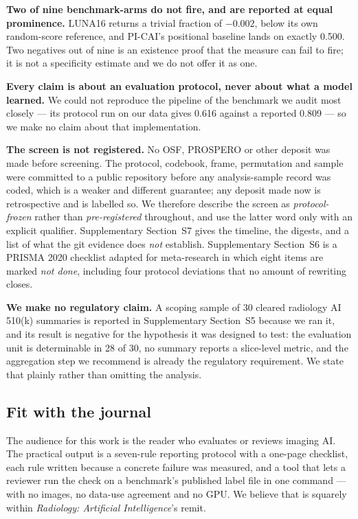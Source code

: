 \documentclass[11pt,a4paper]{article}
\begin{document}
\textbf{Two of nine benchmark-arms do not fire, and are reported at equal
prominence.} LUNA16 returns a trivial fraction of $-0.002$, below its own random-score
reference, and PI-CAI's positional baseline lands on exactly 0.500. Two negatives out
of nine is an existence proof that the measure can fail to fire; it is not a
specificity estimate and we do not offer it as one.

\textbf{Every claim is about an evaluation protocol, never about what a model
learned.} We could not reproduce the pipeline of the benchmark we audit most closely
--- its protocol run on our data gives 0.616 against a reported 0.809 --- so we make
no claim about that implementation.

\textbf{The screen is not registered.} No OSF, PROSPERO or other deposit was made
before screening. The protocol, codebook, frame, permutation and sample were committed
to a public repository before any analysis-sample record was coded, which is a weaker
and different guarantee; any deposit made now is retrospective and is labelled so. We
therefore describe the screen as \emph{protocol-frozen} rather than
\emph{pre-registered} throughout, and use the latter word only with an explicit
qualifier. Supplementary Section~S7 gives the timeline, the digests, and a list of what
the git evidence does \emph{not} establish. Supplementary Section~S6 is a PRISMA 2020
checklist adapted for meta-research in which eight items are marked \emph{not done},
including four protocol deviations that no amount of rewriting closes.

\textbf{We make no regulatory claim.} A scoping sample of 30 cleared radiology AI
510(k) summaries is reported in Supplementary Section~S5 because we ran it, and its
result is negative for the hypothesis it was designed to test: the evaluation unit is
determinable in 28 of 30, no summary reports a slice-level metric, and the aggregation
step we recommend is already the regulatory requirement. We state that plainly rather
than omitting the analysis.

\subsection*{Fit with the journal}

The audience for this work is the reader who evaluates or reviews imaging AI. The
practical output is a seven-rule reporting protocol with a one-page checklist, each
rule written because a concrete failure was measured, and a tool that lets a reviewer
run the check on a benchmark's published label file in one command --- with no images,
no data-use agreement and no GPU. We believe that is squarely within \emph{Radiology:
Artificial Intelligence}'s remit.
\end{document}
